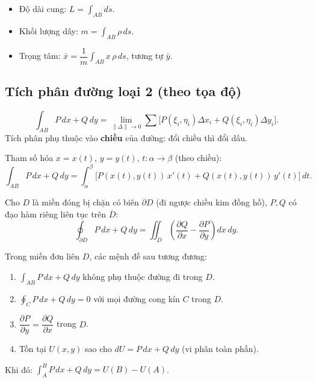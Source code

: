 \documentclass[12pt,a4paper]{article}
\begin{document}
\begin{congthuc}[title={Ứng dụng}]
  \begin{itemize}
    \item Độ dài cung: $L = \displaystyle\int_{AB} ds$.
    \item Khối lượng dây: $m = \displaystyle\int_{AB} \rho\,ds$.
    \item Trọng tâm: $\bar{x} = \dfrac{1}{m}\displaystyle\int_{AB} x\,\rho\,ds$, tương tự $\bar{y}$.
  \end{itemize}
\end{congthuc}

\subsection{Tích phân đường loại 2 (theo tọa độ)}

\begin{dinhnghia}
  \[
    \int_{AB} P\,dx + Q\,dy = \lim_{\|\Delta\| \to 0} \sum \bigl[P(\xi_i,\eta_i)\Delta x_i + Q(\xi_i,\eta_i)\Delta y_i\bigr].
  \]
  Tích phân phụ thuộc vào \textbf{chiều} của đường: đổi chiều thì đổi dấu.
\end{dinhnghia}

\begin{congthuc}[title={Cách tính}]
  Tham số hóa $x = x(t)$, $y = y(t)$, $t: \alpha \to \beta$ (theo chiều):
  \[
    \int_{AB} P\,dx + Q\,dy = \int_\alpha^\beta \bigl[P(x(t), y(t))\,x'(t) + Q(x(t), y(t))\,y'(t)\bigr]\,dt.
  \]
\end{congthuc}

\begin{dinhly}[title={Công thức Green}]
  Cho $D$ là miền đóng bị chặn có biên $\partial D$ (đi ngược chiều kim đồng hồ), $P, Q$ có đạo hàm riêng liên tục trên $\overline{D}$:
  \[
    \oint_{\partial D} P\,dx + Q\,dy = \iint_D \left(\dfrac{\partial Q}{\partial x} - \dfrac{\partial P}{\partial y}\right)dx\,dy.
  \]
\end{dinhly}

\begin{dinhly}[title={Tích phân đường không phụ thuộc đường đi}]
  Trong miền đơn liên $D$, các mệnh đề sau tương đương:
  \begin{enumerate}
    \item $\displaystyle\int_{AB} P\,dx + Q\,dy$ không phụ thuộc đường đi trong $D$.
    \item $\oint_C P\,dx + Q\,dy = 0$ với mọi đường cong kín $C$ trong $D$.
    \item $\dfrac{\partial P}{\partial y} = \dfrac{\partial Q}{\partial x}$ trong $D$.
    \item Tồn tại $U(x,y)$ sao cho $dU = P\,dx + Q\,dy$ (vi phân toàn phần).
  \end{enumerate}
  Khi đó: $\displaystyle\int_A^B P\,dx + Q\,dy = U(B) - U(A)$.
\end{dinhly}
\end{document}
